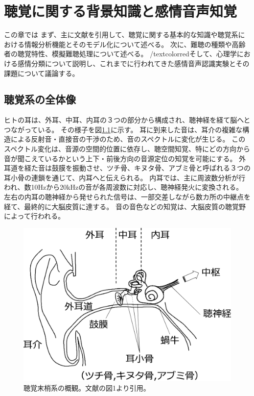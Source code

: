 
\newpage
\chapter{聴覚に関する背景知識と感情音声知覚}
\label{chap:RelatedResearch}

この章では
まず、主に文献\cite{ogushi2019Book, furukawa2021chokaku}を引用して、聴覚に関する基本的な知識や聴覚系における情報分析機能とそのモデル化について述べる。
次に、難聴の種類や高齢者の聴覚特性、模擬難聴処理について述べる。
/textcolor{red}{そして、心理学における感情分類について説明し、これまでに行われてきた感情音声認識実験とその課題について議論する。}


\section{聴覚系の全体像}
\label{sec:Auditory}
ヒトの耳は、外耳、中耳、内耳の３つの部分から構成され、聴神経を経て脳へとつながっている。
その様子を図\ref{fig:Hearingsystem}に示す。
耳に到来した音は、耳介の複雑な構造による反射音・直接音の干渉のため、音のスペクトルに変化が生じる。
このスペクトル変化は、音源の空間的位置に依存し、聴空間知覚、特にどの方向から音が聞こえているかという上下・前後方向の音源定位の知覚を可能にする。
外耳道を経た音は鼓膜を振動させ、ツチ骨、キヌタ骨、アブミ骨と呼ばれる３つの耳小骨の連鎖を通じて、内耳へと伝えられる。
内耳では、主に周波数分析が行われ、数10Hzから20kHzの音が各周波数に対応し、聴神経発火に変換される。
左右の内耳の聴神経から発せられた信号は、一部交差しながら数カ所の中継点を経て、最終的に大脳皮質に達する。
音の音色などの知覚は、大脳皮質の聴覚野によって行われる。

\begin{figure}[htbp]
    \vspace{40pt}
    \centering
    \includegraphics[width=0.6\hsize]{Figure/RelatedResearch/furukawa2017auditory.eps}
    \caption{聴覚末梢系の概観。文献\cite{furukawa2017chokaku}の図1より引用。}
    \label{fig:Hearingsystem}
\end{figure}



